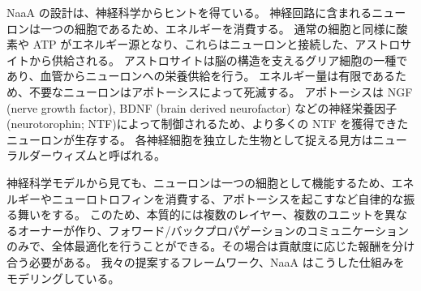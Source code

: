 NaaA の設計は、神経科学からヒントを得ている。
神経回路に含まれるニューロンは一つの細胞であるため、エネルギーを消費する。
通常の細胞と同様に酸素や ATP がエネルギー源となり、これらはニューロンと接続した、アストロサイトから供給される。
アストロサイトは脳の構造を支えるグリア細胞の一種であり、血管からニューロンへの栄養供給を行う。
エネルギー量は有限であるため、不要なニューロンはアポトーシスによって死滅する。
アポトーシスは NGF (nerve growth factor), BDNF (brain derived neurofactor) などの神経栄養因子(neurotorophin; NTF)によって制御されるため、より多くの NTF を獲得できたニューロンが生存する。
各神経細胞を独立した生物として捉える見方はニューラルダーウィズム\citep{edelman1987neural}と呼ばれる。

神経科学モデルから見ても、ニューロンは一つの細胞として機能するため、エネルギーやニューロトロフィンを消費する、アポトーシスを起こすなど自律的な振る舞いをする。
このため、本質的には複数のレイヤー、複数のユニットを異なるオーナーが作り、フォワード/バックプロパゲーションのコミュニケーションのみで、全体最適化を行うことができる。その場合は貢献度に応じた報酬を分け合う必要がある。
我々の提案するフレームワーク、NaaA はこうした仕組みをモデリングしている。
\fi
